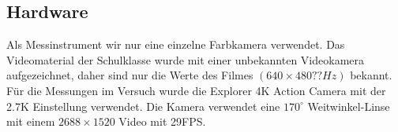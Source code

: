 \subsection{Hardware}
Als Messinstrument wir nur eine einzelne Farbkamera verwendet. Das Videomaterial der Schulklasse wurde mit einer unbekannten Videokamera aufgezeichnet, daher sind nur die Werte des Filmes $(640 \times 480 ??Hz)$ bekannt.\\
Für die Messungen im Versuch wurde die Explorer 4K Action Camera mit der 2.7K Einstellung verwendet. Die Kamera verwendet eine $170^\circ$ Weitwinkel-Linse mit einem $2688 \times 1520$ Video mit 29FPS.